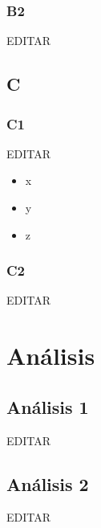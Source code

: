 \documentclass[preprint,12pt]{elsarticle}
\begin{document}
\subsubsection{\textbf{B2}}

EDITAR\\

\subsection{\textbf{C}}

\subsubsection{\textbf{C1}}

EDITAR\\

\begin{itemize}

\item x
\item y
\item z

\end{itemize}
\subsubsection{\textbf{C2}}

EDITAR\\


 



\section{Análisis}

\subsection{\textbf{Análisis 1}}
EDITAR\\

\subsection{\textbf{Análisis 2}}
EDITAR\\
\end{document}
